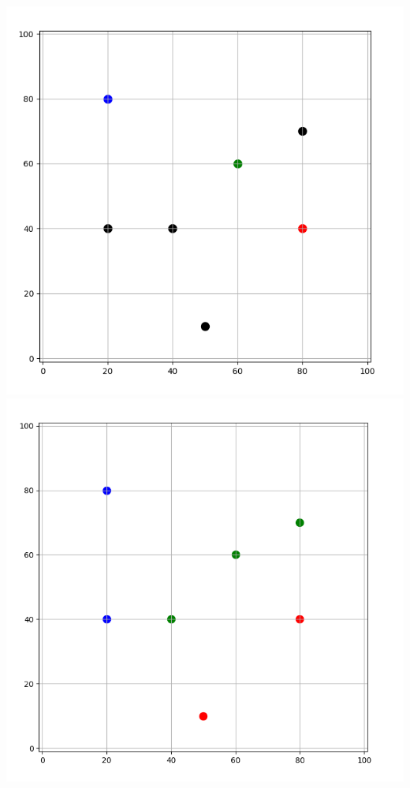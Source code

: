 \documentclass[10pt,class=report,crop=false]{standalone}
\begin{document}
\begin{activite}[Barycentres]
\begin{enumerate}
\begin{enumerate}
		\begin{center}
		\includegraphics[scale=\myscale,scale=0.26]{ecran-barycentres-6a}\qquad
		\includegraphics[scale=\myscale,scale=0.25]{ecran-barycentres-6b}
		\end{center}		
		

\end{enumerate}
\end{enumerate}
\end{activite}
\end{document}
